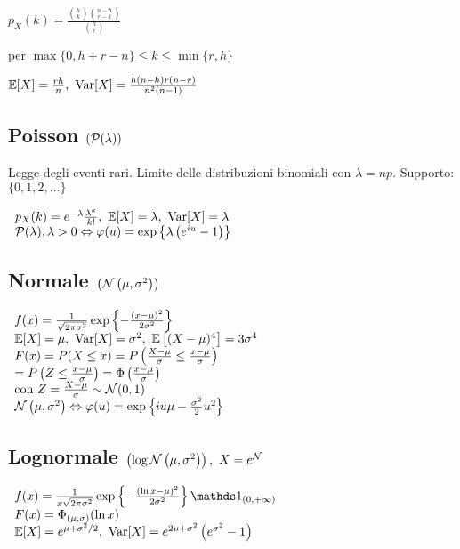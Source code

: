 $p_X(k) =\frac{\binom{h}{k}\binom{n-h}{r-k}}{\binom{n}{r}}$

per $\max\{0,h+r-n\} \leq k\leq \min\{r,h\}$

$\EE[X]=\frac{rh}{n} ,\ \Var[X]=\frac{h(n-h)r(n-r)}{n^2 (n-1)}$
\subsection{Poisson $(\mathcal P (\lambda ))$}

Legge degli eventi rari. Limite delle distribuzioni binomiali con $\lambda =np$. Supporto: $\{0,1,2,\dotsc \}$

$ \begin{array}{l}
p_X(k) =e^{-\lambda}\frac{\lambda^k}{k!} ,\ \EE[X]=\lambda ,\ \Var[X]=\lambda \\
\Pc (\lambda ),\lambda >0\Leftrightarrow \varphi (u)=\exp\left\{\lambda \left( e^{iu} -1\right)\right\}
\end{array}$
\subsection{Normale $\left(\mathcal N\left( \mu ,\sigma^2\right)\right)$}

$ \begin{array}{l}
f(x)=\frac{1}{\sqrt{2\pi \sigma^2}}\exp\left\{-\frac{(x-\mu )^2}{2\sigma^2}\right\}\\
\mathbb E[X]=\mu ,\ \operatorname{Var}[X]=\sigma^2 ,\ \mathbb E\left[ (X-\mu )^4\right] =3\sigma^4\\
F( x) =P(X\leq x)=P\left(\frac{X-\mu}{\sigma} \leq \frac{x-\mu}{\sigma}\right)\\
=P\left( Z\leq \frac{x-\mu}{\sigma}\right) =\Phi \left(\frac{x-\mu}{\sigma}\right) \\ \text{con} \ Z=\frac{X-\mu}{\sigma} \sim \mathcal N (0,1)\\
\mathcal N\left( \mu ,\sigma^2\right) \Leftrightarrow \varphi (u)=\exp\left\{iu\mu -\frac{\sigma^2}{2} u^2\right\}
\end{array}$
\subsection{Lognormale $\left(\log\mathcal N\left( \mu ,\sigma^2\right)\right) ,\ X=e^{\mathcal N}$}

$ \begin{array}{l}
f(x)=\frac{1}{x\sqrt{2\pi \sigma^2}}\exp\left\{-\frac{(\ln x-\mu )^2}{2\sigma^2}\right\}\Ind_{(0,+\infty )} \\
F(x)=\Phi_{(\mu ,\sigma )} (\ln x)\\
\EE[X]=e^{\mu +\sigma^2 /2} ,\ \Var[X]=e^{2\mu +\sigma^2}\left( e^{\sigma^2} -1\right)
\end{array}$
